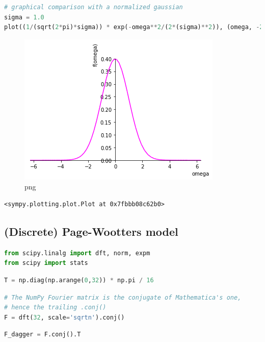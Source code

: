 \begin{lstlisting}[language=Python]
# graphical comparison with a normalized gaussian
sigma = 1.0
plot((1/(sqrt(2*pi)*sigma)) * exp(-omega**2/(2*(sigma)**2)), (omega, -2*pi, 2*pi), line_color='magenta')
\end{lstlisting}

\begin{figure}
\centering
\includegraphics[width=0.66\linewidth]{output_60_0.png}
\caption[]{png}
\end{figure}

\begin{lstlisting}
<sympy.plotting.plot.Plot at 0x7fbbb08c62b0>
\end{lstlisting}

\hypertarget{discrete-page-wootters-model}{%
\subsection{(Discrete) Page-Wootters
model}\label{discrete-page-wootters-model}}

\begin{lstlisting}[language=Python]
from scipy.linalg import dft, norm, expm
from scipy import stats
\end{lstlisting}

\begin{lstlisting}[language=Python]
T = np.diag(np.arange(0,32)) * np.pi / 16
\end{lstlisting}

\begin{lstlisting}[language=Python]
# The NumPy Fourier matrix is the conjugate of Mathematica's one,
# hence the trailing .conj() 
F = dft(32, scale='sqrtn').conj()
\end{lstlisting}

\begin{lstlisting}[language=Python]
F_dagger = F.conj().T
\end{lstlisting}

